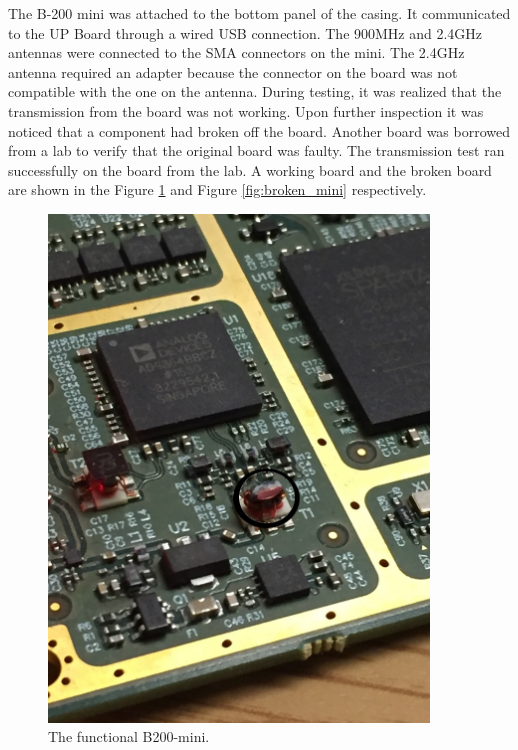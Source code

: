 The B-200 mini was attached to the bottom panel of the casing. It communicated to the UP Board through a wired USB connection. The 900MHz and 2.4GHz antennas were connected to the SMA connectors on the mini. The 2.4GHz antenna required an adapter because the connector on the board was not compatible with the one on the antenna. During testing, it was realized that the transmission from the board was not working. Upon further inspection it was noticed that a component had broken off the board. Another board was borrowed from a lab to verify that the original board was faulty. The transmission test ran successfully on the board from the lab. A working board and the broken board are shown in the Figure \ref{fig:working_mini} and Figure \ref{fig:broken_mini} respectively.
\begin{figure}[ht!]
\begin{minipage}{.5\textwidth}
  \centering
\includegraphics[width=0.9\textwidth]{img/working_mini_labeled.jpg}
\caption{The functional B200-mini.}
\label{fig:working_mini}
\end{minipage}
\begin{minipage}{0.5\textwidth}

\end{minipage}
\end{figure}

